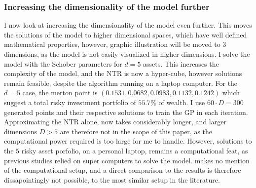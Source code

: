\documentclass[11pt]{article}
\begin{document}
\subsubsection{Increasing the dimensionality of the model further} \label{Subsubsection: IncreasingDimensionalityFurther}
I now look at increasing the dimensionality of the model even further.
This moves the solutions of the model to higher dimensional spaces, which have well defined mathematical properties, however,
graphic illustration will be moved to $3$ dimensions, as the model is not easily visualized in higher dimensions.
I solve the model with the Schober parameters for $d = 5$ assets. This increases the complexity of the model, and the \ac{NTR} is now a hyper-cube,
however solutions remain feasible, despite the algorithm running on a laptop computer.
For the $d = 5$ case, the merton point is $(0.1531, 0.0682, 0.0983, 0.1132, 0.1242)$ which suggest a total risky investment portfolio of $55.7\%$ of wealth.
I use $60\cdot D = 300$ generated points and their respective solutions to train the \ac{GP} in each iteration.
Approximating the \ac{NTR} alone, now takes considerably longer, and larger dimensions $D>5$ are therefore not in the scope of this paper, as the computational power required
is too large for me to handle.
However, solutions to the $5$ risky asset porfolio, on a personal laptop, remains a computational feat, as previous studies \autocites{CaiJuddXu2013}{Schober2022} relied on super computers to solve the model.
\autocite{Scheidegger2023} makes no mention of the computational setup, and a direct comparison to the results is therefore dissapointingly not possible, 
to the most similar setup in the literature.
\end{document}
